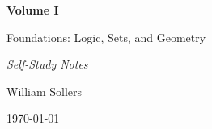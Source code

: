 \begin{titlepage}
\centering

\vspace*{5cm}

{\Huge\bfseries Volume I\par}

\vspace{0.5cm}

{\LARGE Foundations: Logic, Sets, and Geometry\par}

\vspace{0.5cm}

{\large\itshape Self-Study Notes\par}

\vfill

{\large William Sollers\par}

\vspace{0.5cm}

{\large \today\par}

\end{titlepage}
